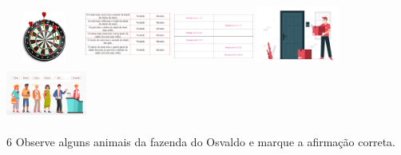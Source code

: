 \begin{escolha}
\begin{escolha}
\begin{escolha}
\item \includegraphics[width=0.98131in,height=0.65625in]{media/image108.png}
\includegraphics[width=1.10972in,height=0.74212in]{media/image109.png}
\includegraphics[width=1.02736in,height=0.68704in]{media/image110.png}
\includegraphics[width=1.09268in,height=0.73073in]{media/image112.png}
\includegraphics[width=1.04264in,height=0.69727in]{media/image113.png}
\end{escolha}


\num{6} Observe alguns animais da fazenda do Osvaldo e marque a afirmação correta.


\end{escolha}
\end{escolha}
